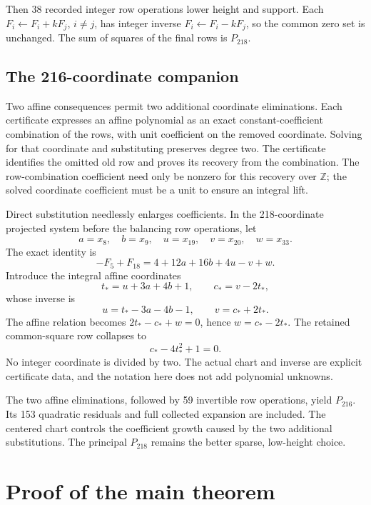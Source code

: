 \documentclass[11pt,letterpaper]{article}
\theoremstyle{remark}
\newcommand{\Z}{\mathbb Z}
\begin{document}
Then 38 recorded integer row operations lower height and support.
Each \(F_i\leftarrow F_i+kF_j\), \(i\ne j\), has integer inverse
\(F_i\leftarrow F_i-kF_j\), so the common zero set is unchanged.
The sum of squares of the final rows is \(P_{218}\).

\subsection{The 216-coordinate companion}

Two affine consequences permit two additional coordinate
eliminations. Each certificate expresses an affine polynomial as
an exact constant-coefficient combination of the rows, with unit
coefficient on the removed coordinate. Solving for that coordinate
and substituting preserves degree two. The certificate identifies
the omitted old row and proves its recovery from the combination.
The row-combination coefficient need only be nonzero for this
recovery over \(\Z\); the solved coordinate coefficient must be a
unit to ensure an integral lift.

Direct substitution needlessly enlarges coefficients. In the
218-coordinate projected system before the balancing row operations,
let
\[
 a=x_8,\quad b=x_9,\quad u=x_{19},\quad
 v=x_{20},\quad w=x_{33}.
\]
The exact identity is
\[
 -F_5+F_{18}=4+12a+16b+4u-v+w.
\]
Introduce the integral affine coordinates
\[
 t_*=u+3a+4b+1,\qquad c_*=v-2t_*,
\]
whose inverse is
\[
 u=t_*-3a-4b-1,\qquad v=c_*+2t_*.
\]
The affine relation becomes \(2t_*-c_*+w=0\), hence
\(w=c_*-2t_*\). The retained common-square row collapses to
\[
 c_*-4t_*^2+1=0.
\]
No integer coordinate is divided by two. The actual chart and
inverse are explicit certificate data, and the notation here does
not add polynomial unknowns.

The two affine eliminations, followed by 59 invertible row
operations, yield \(P_{216}\). Its 153 quadratic residuals and full
collected expansion are included. The centered chart controls the
coefficient growth caused by the two additional substitutions.
The principal \(P_{218}\) remains the better sparse, low-height
choice.

\section{Proof of the main theorem}
\end{document}
